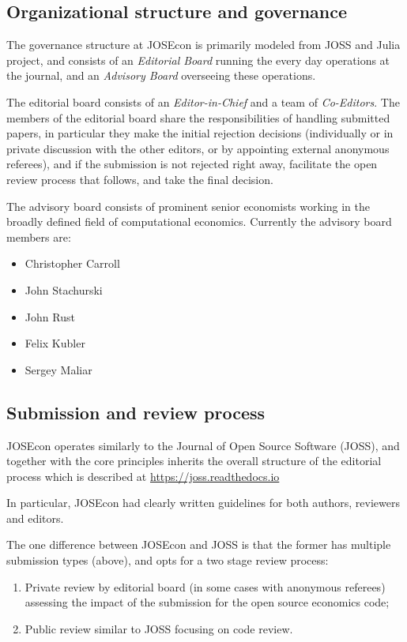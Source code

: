 
\subsection{Organizational structure and governance}

The governance structure at JOSEcon is primarily modeled from JOSS and Julia project,
and consists of an \emph{Editorial Board} running the every day operations at the 
journal, and an \emph{Advisory Board} overseeing these operations.

The editorial board consists of an \emph{Editor-in-Chief} and a team of \emph{Co-Editors}.
The members of the editorial board share the responsibilities of handling submitted papers, 
in particular they make the initial rejection decisions (individually or in private discussion
with the other editors, or by appointing external anonymous referees), 
and if the submission is not rejected right away, facilitate the open review process that
follows, and take the final decision.

The advisory board consists of prominent senior economists working in the broadly 
defined field of computational economics.  Currently the advisory board members are:
\begin{itemize}
\item Christopher Carroll
\item John Stachurski
\item John Rust
\item Felix Kubler
\item Sergey Maliar    
\end{itemize}


\subsection{Submission and review process}

JOSEcon operates similarly to the Journal of Open Source Software (JOSS), and together
with the core principles inherits the overall structure of the editorial process
which is described at \url{https://joss.readthedocs.io}

In particular, JOSEcon had clearly written guidelines for both authors, reviewers and editors.

The one difference between JOSEcon and JOSS is that the former has multiple 
submission types (above), and opts for a two stage review process:
\begin{enumerate}
\item Private review by editorial board (in some cases with anonymous referees) assessing 
the impact of the submission for the open source economics code;
\item Public review similar to JOSS focusing on code review.
\end{enumerate}


